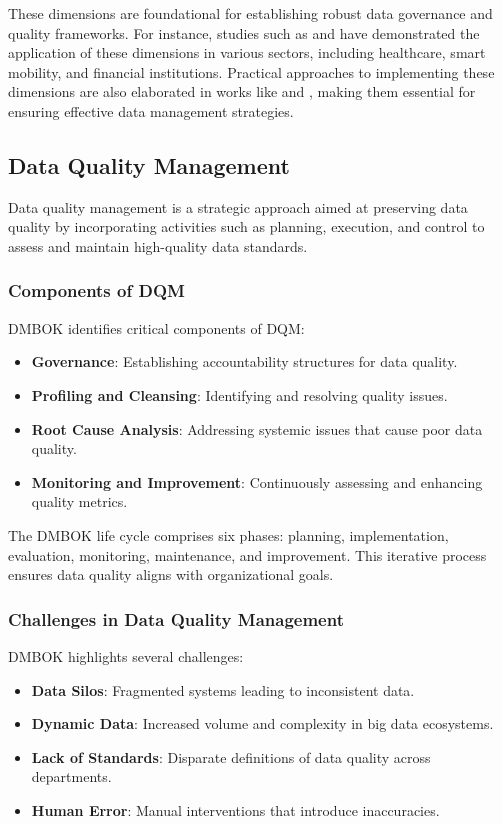 \documentclass[conference]{IEEEtran}
\begin{document}
These dimensions are foundational for establishing robust data governance and quality frameworks. For instance, studies such as \cite{wahyudi2023data} and \cite{kiran2024addressing} have demonstrated the application of these dimensions in various sectors, including healthcare, smart mobility, and financial institutions. Practical approaches to implementing these dimensions are also elaborated in works like \cite{sebastiancoleman2022meeting} and \cite{mahanti2019data}, making them essential for ensuring effective data management strategies.

\subsection{Data Quality Management}
Data quality management is a strategic approach aimed at preserving data quality by incorporating activities such as planning, execution, and control to assess and maintain high-quality data standards.

\subsubsection{Components of DQM}

DMBOK identifies critical components of DQM:
\begin{itemize}
    \item \textbf{Governance}: Establishing accountability structures for data quality.
    \item \textbf{Profiling and Cleansing}: Identifying and resolving quality issues.
    \item \textbf{Root Cause Analysis}: Addressing systemic issues that cause poor data quality.
    \item \textbf{Monitoring and Improvement}: Continuously assessing and enhancing quality metrics.
\end{itemize}

The DMBOK life cycle comprises six phases: planning, implementation, evaluation, monitoring, maintenance, and improvement. This iterative process ensures data quality aligns with organizational goals.

\subsubsection{Challenges in Data Quality Management}
DMBOK highlights several challenges:
\begin{itemize}
    \item \textbf{Data Silos}: Fragmented systems leading to inconsistent data.
    \item \textbf{Dynamic Data}: Increased volume and complexity in big data ecosystems.
    \item \textbf{Lack of Standards}: Disparate definitions of data quality across departments.
    \item \textbf{Human Error}: Manual interventions that introduce inaccuracies.
\end{itemize}
\end{document}
